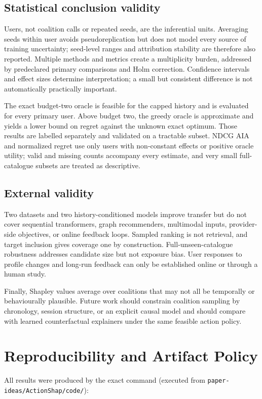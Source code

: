 \documentclass[11pt]{article}
\begin{document}
\subsection{Statistical conclusion validity}
Users, not coalition calls or repeated seeds, are the inferential units. Averaging seeds within user avoids pseudoreplication but does not model every source of training uncertainty; seed-level ranges and attribution stability are therefore also reported. Multiple methods and metrics create a multiplicity burden, addressed by predeclared primary comparisons and Holm correction. Confidence intervals and effect sizes determine interpretation; a small but consistent difference is not automatically practically important.

The exact budget-two oracle is feasible for the capped history and is evaluated for every primary user. Above budget two, the greedy oracle is approximate and yields a lower bound on regret against the unknown exact optimum. Those results are labelled separately and validated on a tractable subset. NDCG AIA and normalized regret use only users with non-constant effects or positive oracle utility; valid and missing counts accompany every estimate, and very small full-catalogue subsets are treated as descriptive.

\subsection{External validity}
Two datasets and two history-conditioned models improve transfer but do not cover sequential transformers, graph recommenders, multimodal inputs, provider-side objectives, or online feedback loops. Sampled ranking is not retrieval, and target inclusion gives coverage one by construction. Full-unseen-catalogue robustness addresses candidate size but not exposure bias. User responses to profile changes and long-run feedback can only be established online or through a human study.

Finally, Shapley values average over coalitions that may not all be temporally or behaviourally plausible. Future work should constrain coalition sampling by chronology, session structure, or an explicit causal model and should compare with learned counterfactual explainers under the same feasible action policy.

\section{Reproducibility and Artifact Policy}
All results were produced by the exact command (executed from \texttt{paper-ideas/ActionShap/code/}):
\end{document}
